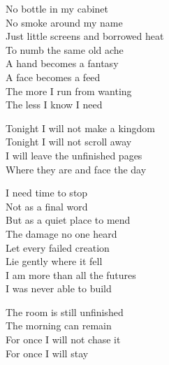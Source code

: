 \begin{lyrics}
No bottle in my cabinet\\
No smoke around my name\\
Just little screens and borrowed heat\\
To numb the same old ache\\
A hand becomes a fantasy\\
A face becomes a feed\\
The more I run from wanting\\
The less I know I need

Tonight I will not make a kingdom\\
Tonight I will not scroll away\\
I will leave the unfinished pages\\
Where they are and face the day

I need time to stop\\
Not as a final word\\
But as a quiet place to mend\\
The damage no one heard\\
Let every failed creation\\
Lie gently where it fell\\
I am more than all the futures\\
I was never able to build

The room is still unfinished\\
The morning can remain\\
For once I will not chase it\\
For once I will stay
\end{lyrics}


